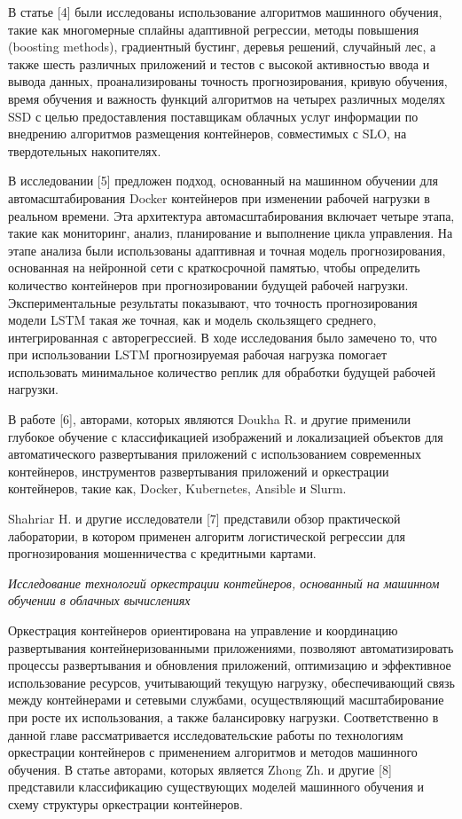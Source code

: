 \begin{multicols}{2}
В статье {[}4{]} были исследованы использование алгоритмов машинного
обучения, такие как многомерные сплайны адаптивной регрессии, методы
повышения (boosting methods), градиентный бустинг, деревья решений,
случайный лес, а также шесть различных приложений и тестов с высокой
активностью ввода и вывода данных, проанализированы точность
прогнозирования, кривую обучения, время обучения и важность функций
алгоритмов на четырех различных моделях SSD с целью предоставления
поставщикам облачных услуг информации по внедрению алгоритмов размещения
контейнеров, совместимых с SLO, на твердотельных накопителях.

В исследовании {[}5{]} предложен подход, основанный на машинном обучении
для автомасштабирования Docker контейнеров при изменении рабочей
нагрузки в реальном времени. Эта архитектура автомасштабирования
включает четыре этапа, такие как мониторинг, анализ, планирование и
выполнение цикла управления. На этапе анализа были использованы
адаптивная и точная модель прогнозирования, основанная на нейронной сети
с краткосрочной памятью, чтобы определить количество контейнеров при
прогнозировании будущей рабочей нагрузки. Экспериментальные результаты
показывают, что точность прогнозирования модели LSTM такая же точная,
как и модель скользящего среднего, интегрированная с авторегрессией. В
ходе исследования было замечено то, что при использовании LSTM
прогнозируемая рабочая нагрузка помогает использовать минимальное
количество реплик для обработки будущей рабочей нагрузки.

В работе {[}6{]}, авторами, которых являются Doukha R. и другие
применили глубокое обучение с классификацией изображений и локализацией
объектов для автоматического развертывания приложений с использованием
современных контейнеров, инструментов развертывания приложений и
оркестрации контейнеров, такие как, Docker, Kubernetes, Ansible и Slurm.

Shahriar H. и другие исследователи {[}7{]} представили обзор
практической лаборатории, в котором применен алгоритм логистической
регрессии для прогнозирования мошенничества с кредитными картами.

\emph{Исследование технологий оркестрации контейнеров, основанный на
машинном обучении в облачных вычислениях}

Оркестрация контейнеров ориентирована на управление и координацию
развертывания контейнеризованными приложениями, позволяют
автоматизировать процессы развертывания и обновления приложений,
оптимизацию и эффективное использование ресурсов, учитывающий текущую
нагрузку, обеспечивающий связь между контейнерами и сетевыми службами,
осуществляющий масштабирование при росте их использования, а также
балансировку нагрузки. Соответственно в данной главе рассматривается
исследовательские работы по технологиям оркестрации контейнеров с
применением алгоритмов и методов машинного обучения. В статье авторами,
которых является Zhong Zh. и другие {[}8{]} представили классификацию
существующих моделей машинного обучения и схему структуры оркестрации
контейнеров.


\end{multicols}
